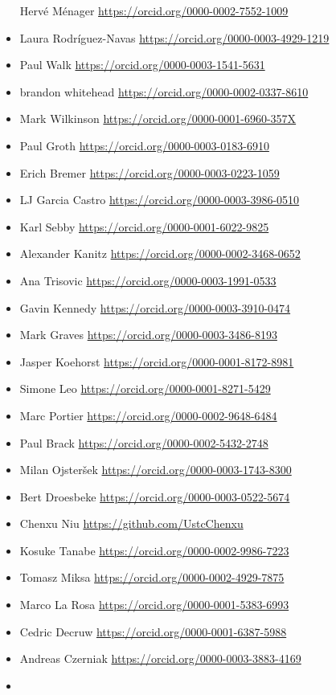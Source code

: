 \begin{itemize}
  Hervé Ménager \url{https://orcid.org/0000-0002-7552-1009}
\item
  Laura Rodríguez-Navas \url{https://orcid.org/0000-0003-4929-1219}
\item
  Paul Walk \url{https://orcid.org/0000-0003-1541-5631}
\item
  brandon whitehead \url{https://orcid.org/0000-0002-0337-8610}
\item
  Mark Wilkinson \url{https://orcid.org/0000-0001-6960-357X}
\item
  Paul Groth \url{https://orcid.org/0000-0003-0183-6910}
\item
  Erich Bremer \url{https://orcid.org/0000-0003-0223-1059}
\item
  LJ Garcia Castro \url{https://orcid.org/0000-0003-3986-0510}
\item
  Karl Sebby \url{https://orcid.org/0000-0001-6022-9825}
\item
  Alexander Kanitz \url{https://orcid.org/0000-0002-3468-0652}
\item
  Ana Trisovic \url{https://orcid.org/0000-0003-1991-0533}
\item
  Gavin Kennedy \url{https://orcid.org/0000-0003-3910-0474}
\item
  Mark Graves \url{https://orcid.org/0000-0003-3486-8193}
\item
  Jasper Koehorst \url{https://orcid.org/0000-0001-8172-8981}
\item
  Simone Leo \url{https://orcid.org/0000-0001-8271-5429}
\item
  Marc Portier \url{https://orcid.org/0000-0002-9648-6484}
\item
  Paul Brack \url{https://orcid.org/0000-0002-5432-2748}
\item
  Milan Ojsteršek \url{https://orcid.org/0000-0003-1743-8300}
\item
  Bert Droesbeke \url{https://orcid.org/0000-0003-0522-5674}
\item
  Chenxu Niu \url{https://github.com/UstcChenxu}
\item
  Kosuke Tanabe \url{https://orcid.org/0000-0002-9986-7223}
\item
  Tomasz Miksa \url{https://orcid.org/0000-0002-4929-7875}
\item
  Marco La Rosa \url{https://orcid.org/0000-0001-5383-6993}
\item
  Cedric Decruw \url{https://orcid.org/0000-0001-6387-5988}
\item
  Andreas Czerniak \url{https://orcid.org/0000-0003-3883-4169}
\item

\end{itemize}
